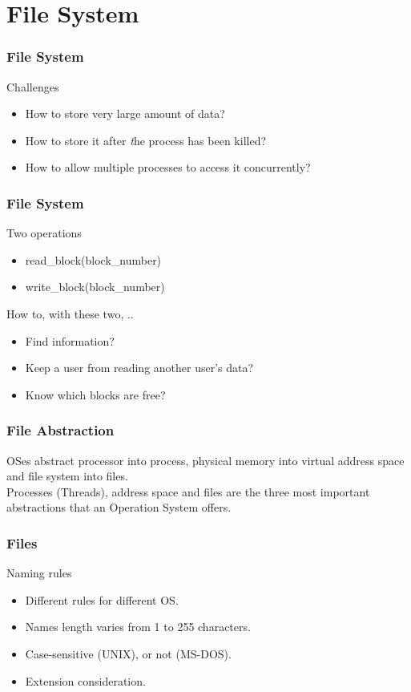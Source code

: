\section{File System}

\begin{frame}
  \frametitle{File System}
  \begin{block}{Challenges}
    \begin{itemize}
      \item How to store very large amount of data?
      \item How to store it after {\emph the} process has been killed?
      \item How to allow multiple processes to access it concurrently?
    \end{itemize}
  \end{block}
\end{frame}

\begin{frame}
  \frametitle{File System}
  \begin{block}{Two operations}
    \begin{itemize}
      \item read\_block(block\_number)
      \item write\_block(block\_number)
    \end{itemize}
  \end{block} \pause
  \begin{block}{How to, with these two, ..}
    \begin{itemize}
      \item Find information?
      \item Keep a user from reading another user's data?
      \item Know which blocks are free?
    \end{itemize}
  \end{block}
\end{frame}

\begin{frame}
  \frametitle{File Abstraction}
  OSes abstract processor into process, physical memory into virtual address space and file system into files. \\
  Processes (Threads), address space and files are the three most important abstractions that an Operation System offers.
\end{frame}

\begin{frame}
  \frametitle{Files}
  \begin{block}{Naming rules}
    \begin{itemize}
      \item Different rules for different OS.
      \item Names length varies from 1 to 255 characters.
      \item Case-sensitive (UNIX), or not (MS-DOS).
      \item Extension consideration.
    \end{itemize}
  \end{block}
\end{frame}

